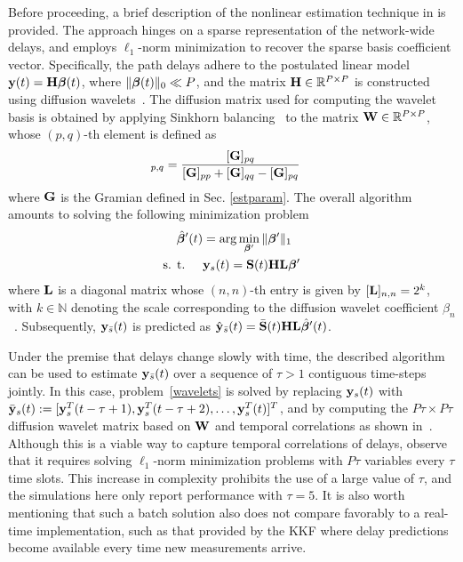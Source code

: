 \documentclass[draftcls,onecolumn,12pt]{IEEEtran}
\def \y {{\b{y}}}
\def \yst {{\b{y}_s(t)}}
\def \by {{\bar{\b{y}}_s(t)}}
\def \ybt {{\b{y}_{\bar{s}}(t)}}
\def \yh {{\hat{\b{y}}_{\bar{s}}}}
\def \bbeta {{\bs{\beta}}}
\def \Sb {{\bar{\b{S}}(t)}}
\theoremstyle{plain}\newtheorem{thm}{Theorem}
\theoremstyle{definition}
\theoremstyle{remark}
\begin{document}
Before proceeding, a brief description of the nonlinear estimation technique in \cite{coates} is provided. The approach hinges on a sparse representation of the network-wide delays, and employs $\ell_1$-norm minimization to recover the sparse basis coefficient vector. Specifically, the path delays adhere to the postulated linear model $\b{y}(t) =  \b{H} \bbeta(t)$, where $\|\bbeta(t)\|_0 \ll P$, and the matrix $\mathbf{H} \in \mathbb{R}^{P \times P}$ is constructed using diffusion wavelets~\cite{Maggioni}. The diffusion matrix used for computing the wavelet basis is obtained by applying Sinkhorn balancing~\cite{sinkhorn} to the matrix $\mathbf{W} \in \mathbb{R}^{P \times P}$, whose $(p,q)$-th element is defined as 
\begin{align}
[\b{W}]_{p,q} &= \frac{[\b{G}]_{pq}}{[\b{G}]_{pp}+[\b{G}]_{qq} - [\b{G}]_{pq}} 
\end{align}
where $\mathbf{G}$ is the Gramian defined in Sec. \ref{estparam}. The overall algorithm amounts to solving the following minimization problem 
\begin{subequations}
\label{wavelets}
\begin{align}
\hat \bbeta^{\prime}(t) & = \arg \min_{\bbeta^{\prime}} \| \bbeta^{\prime} \|_1 \\
\text{s. t.}\hspace{0.5cm} & \yst = \b{S}(t) \b{H} \b{L} \bbeta^{\prime} 
\end{align}
\end{subequations}
where $\mathbf{L}$ is a diagonal matrix whose $(n,n)$-th entry is given by $[\mathbf{L}]_{n,n} = 2^k$, with $k \in \mathbb{N}$ denoting the scale corresponding to the diffusion wavelet coefficient $\beta_n$~\cite{coates}. Subsequently, $\ybt$ is predicted as $\yh(t) = \Sb \b{HL} \hat{\bbeta}^{\prime}(t)$. 

Under the premise that delays change slowly with time, the described algorithm can be used to estimate $\mathbf{y}_{\bar{s}}(t)$ over a sequence of $\tau > 1$ contiguous time-steps jointly. In this case, problem~\eqref{wavelets} is solved by replacing $\yst$ with $\by := [\y_{s}^T(t-\tau+1), \y_{s}^T(t-\tau+2), \ldots, \y_{s}^T(t)]^T$, and by computing the $P \tau \times P \tau$ diffusion wavelet matrix based on $\mathbf{W}$ and temporal correlations as shown in~\cite{coates}. Although this is a viable way to capture temporal correlations of delays, observe that it requires solving $\ell_1$-norm minimization problems with $P\tau$ variables every $\tau$ time slots. 
This increase in complexity prohibits the use of a large value of $\tau$, and the simulations here only report performance with $\tau = 5$.
It is also worth mentioning that such a batch solution also does not compare favorably to a real-time implementation, such as that provided by the KKF where delay predictions become available every time new measurements arrive. 
\end{document}
